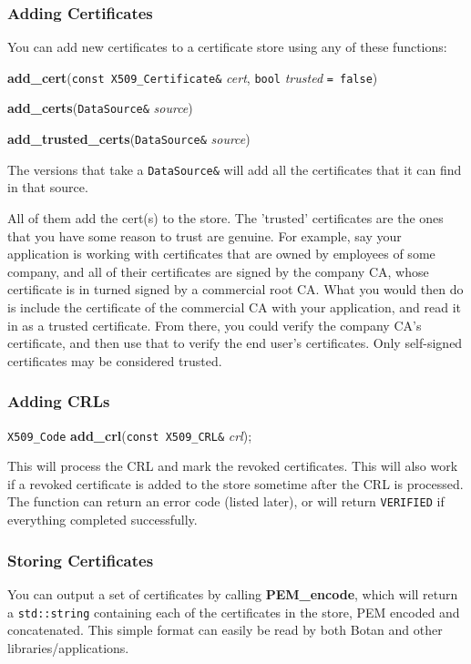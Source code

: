\documentclass{article}
\newcommand{\function}[1]{\textbf{#1}}
\newcommand{\type}[1]{\texttt{#1}}
\renewcommand{\arg}[1]{\textsl{#1}}
\begin{document}
\subsubsection{Adding Certificates}

You can add new certificates to a certificate store using any of these
functions:

\function{add\_cert}(\type{const X509\_Certificate\&} \arg{cert},
                     \type{bool} \arg{trusted} \type{= false})

\function{add\_certs}(\type{DataSource\&} \arg{source})

\function{add\_trusted\_certs}(\type{DataSource\&} \arg{source})

The versions that take a \type{DataSource\&} will add all the certificates
that it can find in that source.

All of them add the cert(s) to the store. The 'trusted' certificates are the
ones that you have some reason to trust are genuine. For example, say your
application is working with certificates that are owned by employees of some
company, and all of their certificates are signed by the company CA, whose
certificate is in turned signed by a commercial root CA. What you would then do
is include the certificate of the commercial CA with your application, and read
it in as a trusted certificate. From there, you could verify the company CA's
certificate, and then use that to verify the end user's certificates. Only
self-signed certificates may be considered trusted.

\subsubsection{Adding CRLs}

\type{X509\_Code} \function{add\_crl}(\type{const X509\_CRL\&} \arg{crl});

This will process the CRL and mark the revoked certificates. This will also
work if a revoked certificate is added to the store sometime after the CRL is
processed. The function can return an error code (listed later), or will return
\type{VERIFIED} if everything completed successfully.

\subsubsection{Storing Certificates}

You can output a set of certificates by calling \function{PEM\_encode}, which
will return a \type{std::string} containing each of the certificates in the
store, PEM encoded and concatenated. This simple format can easily be read by
both Botan and other libraries/applications.
\end{document}
